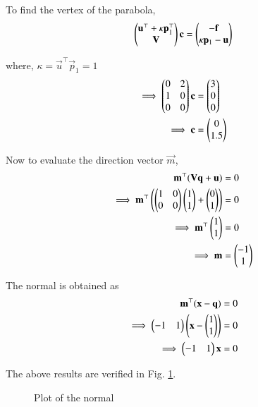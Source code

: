 \documentclass[journal,12pt,twocolumn]{IEEEtran}
\begin{document}
To find the vertex of the parabola,
\begin{equation}
    \begin{pmatrix}\mathbf{u}^\top+\kappa \mathbf{p}_1^\top\\\mathbf{V}\end{pmatrix}\mathbf{c} = \begin{pmatrix}-\mathbf{f}\\\kappa \mathbf{p}_1-\mathbf{u}\end{pmatrix}
\end{equation}

where, $\kappa = \vec{u}^\top\vec{p}_1 = 1$
\begin{align}
    \implies \begin{pmatrix}0&2\\1&0\\0&0\end{pmatrix}\mathbf{c} &= \begin{pmatrix}3\\0\\0\end{pmatrix}\\
    \implies \mathbf{c} &= \begin{pmatrix}0\\1.5\end{pmatrix}
\end{align}

Now to evaluate the direction vector $\vec{m}$,
\begin{align}
    \mathbf{m}^\top (\mathbf{V}\mathbf{q}+\mathbf{u}) &= 0\\
    \implies \mathbf{m}^\top \begin{pmatrix}\begin{pmatrix}1&0\\0&0\end{pmatrix}\begin{pmatrix}1\\1\end{pmatrix}+\begin{pmatrix}0\\1\end{pmatrix}\end{pmatrix} &= 0\\
    \implies \mathbf{m}^\top \begin{pmatrix}1\\1\end{pmatrix} &= 0\\
    \implies \mathbf{m} &= \begin{pmatrix}-1\\1\end{pmatrix}
\end{align}

The normal is obtained as 
\begin{align}
    \mathbf{m}^\top (\mathbf{x}-\mathbf{q}) &= 0\\
    \implies \begin{pmatrix}-1&1\end{pmatrix}\begin{pmatrix}\mathbf{x}-\begin{pmatrix}1\\1\end{pmatrix}\end{pmatrix} &= 0\\
    \implies \begin{pmatrix}-1&1\end{pmatrix}\mathbf{x} &= 0
\end{align}

The above results are verified in Fig. \ref{plot}. 
\begin{figure}
    \centering
    \caption{Plot of the normal}
    \label{plot}
\end{figure}
\end{document}
